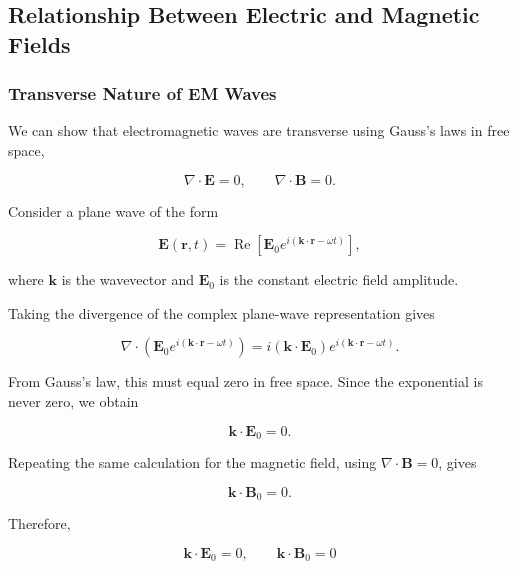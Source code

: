 \subsection{Relationship Between Electric and Magnetic Fields}


\subsubsection{Transverse Nature of EM Waves}

We can show that electromagnetic waves are transverse
using Gauss's laws in free space,

\begin{equation}
\boxed{\nabla\cdot\mathbf{E} = 0,
\qquad
\nabla\cdot\mathbf{B} = 0.}
\end{equation}

Consider a plane wave of the form

\begin{equation}
\mathbf{E}(\mathbf{r},t)
= \operatorname{Re}\left[
\mathbf{E}_0 e^{i(\mathbf{k}\cdot\mathbf{r}-\omega t)}
\right],
\end{equation}

where $\mathbf{k}$ is the wavevector and
$\mathbf{E}_0$ is the constant electric field amplitude.

Taking the divergence of the complex plane-wave
representation gives

\begin{equation}
\nabla\cdot\left(
\mathbf{E}_0 e^{i(\mathbf{k}\cdot\mathbf{r}-\omega t)}
\right)
=
i(\mathbf{k}\cdot\mathbf{E}_0)
e^{i(\mathbf{k}\cdot\mathbf{r}-\omega t)}.
\end{equation}

From Gauss's law, this must equal zero in free space.
Since the exponential is never zero, we obtain

\begin{equation}
\boxed{\mathbf{k}\cdot\mathbf{E}_0 = 0}.
\end{equation}

Repeating the same calculation for the magnetic field,
using $\nabla\cdot\mathbf{B}=0$, gives

\begin{equation}
\boxed{\mathbf{k}\cdot\mathbf{B}_0 = 0}.
\end{equation}

Therefore,

\begin{equation}
\boxed{
\mathbf{k}\cdot\mathbf{E}_0 = 0,
\qquad
\mathbf{k}\cdot\mathbf{B}_0 = 0
}
\label{eq:em_transverse}
\end{equation}

